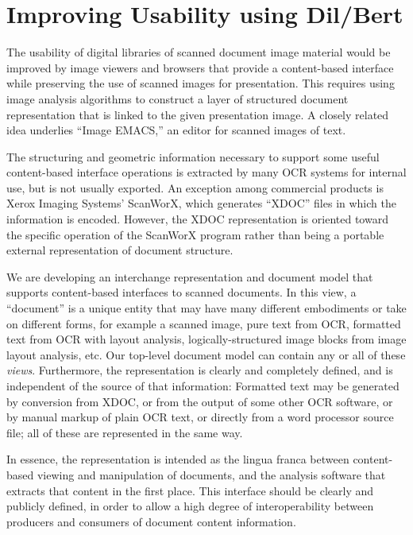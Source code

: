 \section{Improving Usability using Dil/Bert}

The usability of digital libraries of scanned document image material would
be improved by image viewers and browsers that provide a content-based
interface while preserving the use of scanned images for presentation. This
requires using image analysis algorithms to construct a layer of structured
document representation that is linked to the given presentation image.  A
closely related idea underlies ``Image EMACS,'' an editor for scanned images
of text\cite{imagemacs}.

The structuring and geometric information necessary to support some
useful content-based interface operations is extracted by many OCR
systems for internal use, but is not usually exported. An exception
among commercial products is Xerox Imaging Systems' ScanWorX, which
generates ``XDOC'' files in which the information is encoded. However,
the XDOC representation is oriented toward the specific operation of
the ScanWorX program rather than being a portable external
representation of document structure.

We are developing an interchange representation and document model that
supports content-based interfaces to scanned documents.
In this view, a ``document'' is a unique entity that may have many
different embodiments or take on different forms, for example a scanned
image, pure text from OCR, formatted text from OCR with layout analysis,
logically-structured image blocks from image layout analysis, etc.  Our
top-level document model can contain any or all of these {\it views\/}.
Furthermore, the representation is clearly and completely defined, and
is independent of the source of that information: Formatted text may be
generated by conversion from XDOC, or from the output of some other OCR
software, or by manual markup of plain OCR text, or directly from a word
processor source file; all of these are represented in the same way.

In essence, the representation is intended as the lingua franca between
content-based viewing and manipulation of documents, and the analysis
software that extracts that content in the first place.  This interface
should be clearly and publicly defined, in order to allow a high
degree of interoperability between producers and consumers of document
content information.

